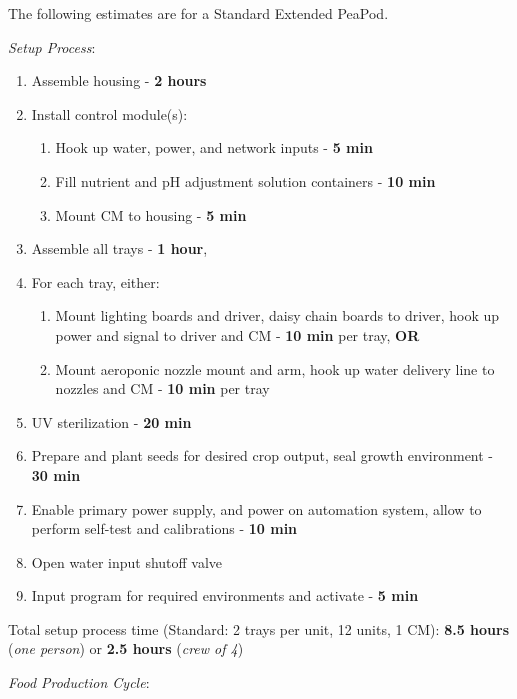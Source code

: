 \documentclass{../tex/report}
\begin{document}
The following estimates are for a Standard Extended PeaPod.

\textit{Setup Process}:

\begin{enumerate}
    \item Assemble housing - \textbf{2 hours}
    \item Install control module(s):
    \begin{enumerate}
        \item Hook up water, power, and network inputs - \textbf{5 min}
        \item Fill nutrient and pH adjustment solution containers - \textbf{10 min}
        \item Mount CM to housing - \textbf{5 min}
    \end{enumerate}
    \item Assemble all trays - \textbf{1 hour},
    \item For each tray, either:
    \begin{enumerate}
        \item Mount lighting boards and driver, daisy chain boards to driver, hook up power and signal to driver and CM - \textbf{10 min} per tray, \textbf{OR}
        \item Mount aeroponic nozzle mount and arm, hook up water delivery line to nozzles and CM - \textbf{10 min} per tray
    \end{enumerate}
    \item UV sterilization - \textbf{20 min}
    \item Prepare and plant seeds for desired crop output, seal growth environment - \textbf{30 min}
    \item Enable primary power supply, and power on automation system, allow to perform self-test and calibrations - \textbf{10 min}
    \item Open water input shutoff valve
    \item Input program for required environments and activate - \textbf{5 min}
\end{enumerate}

Total setup process time (Standard: 2 trays per unit, 12 units, 1 CM): \textbf{8.5 hours} (\textit{one person}) or \textbf{2.5 hours} (\textit{crew of 4})

\newpage

\textit{Food Production Cycle}:
\end{document}
